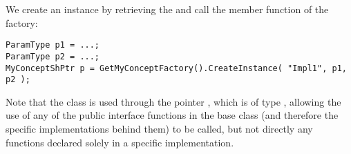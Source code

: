 We create an instance by retrieving the  and call the
 member function of the factory:
\begin{lstlisting}[style=C++Style]
ParamType p1 = ...;
ParamType p2 = ...;
MyConceptShPtr p = GetMyConceptFactory().CreateInstance( "Impl1", p1, p2 );
\end{lstlisting}

Note that the class is used through the pointer , which is of type
, allowing the use of any of the public interface
functions in the base class (and therefore the specific implementations behind them) to be
called, but not directly any functions declared solely in a specific
implementation.
